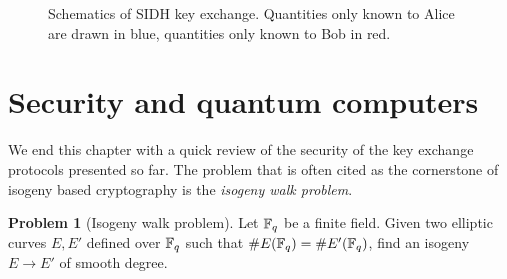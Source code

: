 \documentclass{report}
\theoremstyle{plain}
\theoremstyle{definition}
\newtheorem{problem}{Problem}
\begin{document}
\begin{figure}
  \centering

  \caption{Schematics of SIDH key exchange. Quantities only known to
    Alice are drawn in blue, quantities only known to Bob in red.}
  \label{fig:sidh}
\end{figure}




\section{Security and quantum computers}

We end this chapter with a quick review of the security of the key
exchange protocols presented so far. %
The problem that is often cited as the cornerstone of isogeny based
cryptography is the \emph{isogeny walk problem}.

\begin{problem}[Isogeny walk problem]
  \label{prob:iwp}
  Let $\mathbb{F}_q$ be a finite field. %
  Given two elliptic curves $E,E'$ defined over $\mathbb{F}_q$ such that
  $\#E(\mathbb{F}_q)=\#E'(\mathbb{F}_q)$, find an isogeny $E→E'$ of smooth degree.
\end{problem}
\end{document}
